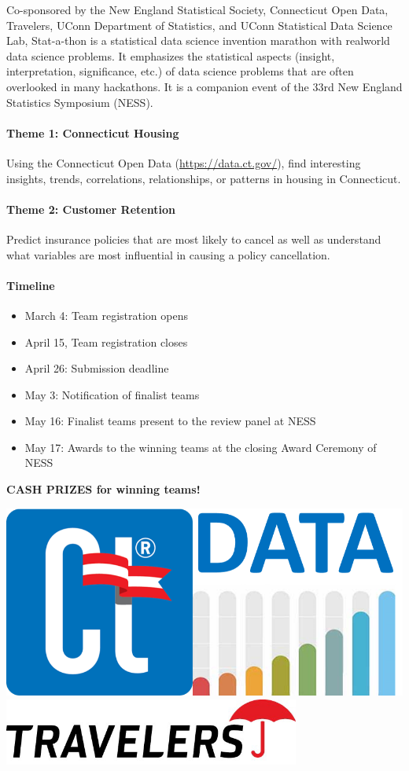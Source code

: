 \documentclass[12pt]{article}
\begin{document}
\begin{large}
Co-sponsored by the New England Statistical Society,
Connecticut Open Data, Travelers,
UConn Department of Statistics, and UConn Statistical Data Science Lab,
Stat-a-thon is a statistical data science invention marathon with
realworld data science problems. It emphasizes the statistical aspects
(insight, interpretation, significance, etc.) of data science problems
that are often overlooked in many hackathons. It is a companion event
of the 33rd New England Statistics Symposium (NESS).


\paragraph{Theme 1: Connecticut Housing}
Using the Connecticut Open Data (\url{https://data.ct.gov/}), find
interesting insights, trends, correlations, relationships, or patterns
in housing in Connecticut.

\paragraph{Theme 2: Customer Retention}
Predict insurance policies that are most likely to cancel as well as
understand what variables are most influential in causing a policy
cancellation.

\paragraph{Timeline}
\begin{itemize}
\item 
  March 4: Team registration opens
\item
  April 15, Team registration closes
\item
  April 26: Submission deadline
\item
  May 3: Notification of finalist teams
\item
  May 16: Finalist teams present to the review panel at NESS
\item
  May 17: Awards to the winning teams at the closing Award Ceremony of NESS
\end{itemize}

\end{large}

\vfill 

\begin{center}
  {\bf\Large
    CASH PRIZES for winning teams!
  }
\end{center}


\begin{center}
  \includegraphics[width=0.26\linewidth]{ct-data}
  \hfill
\includegraphics[width=0.73\textwidth]{travelers-logo}
\end{center}
\end{document}

